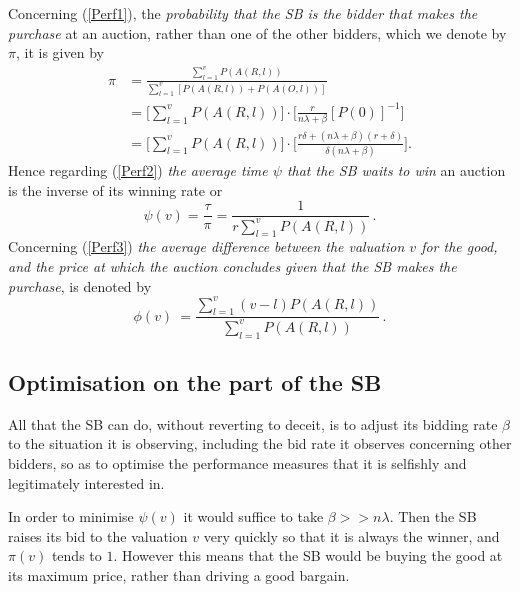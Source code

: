 \documentclass{article}
\begin{document}
Concerning (\ref{Perf1}),  the {\em probability that the SB is the
bidder that makes the purchase} at an auction, rather than one of
the other bidders, which we denote by $\pi$, it is given by
\begin{align} \label{eq:pi_WinningProb}
\pi &=\frac{\sum_{l=1}^{v} P(A(R,l))}{\sum_{l=1}^{v}[P(A(R,l))+P(A(O,l))]} \\
&=\bigg[\sum_{l=1}^{v} P(A(R,l)) \bigg] \cdot \bigg[
\frac{r}{n\lambda+\beta} [P(0)]^{-1} \bigg] \nonumber \\
&=\bigg[\sum_{l=1}^{v} P(A(R,l))\bigg] \cdot \bigg[
\frac{r\delta+(n\lambda+\beta)(r+\delta)} {\delta(n\lambda+\beta)}
\bigg]. \nonumber
\end{align}
Hence regarding (\ref{Perf2}) {\em the average time $\psi$ that
the SB waits to win} an auction is the inverse of its winning rate
or
\begin{equation} \label{eq:FirstModel_ExpWaitToWin}
\psi(v)=\frac{\tau}{\pi}=\frac{1}{r\sum_{l=1}^{v}P(A(R,l))} \,.
\nonumber
\end{equation}
Concerning (\ref{Perf3}) {\em the average difference between the
valuation $v$ for the good, and the price at which the auction
concludes given that the SB makes the purchase}, is denoted by
\begin{equation} \phi(v)\ = \frac{ \sum_{l=1}^{v} (v-l) P(A(R,l))
}{ \sum_{l=1}^{v}P(A(R,l))} \,.
\end{equation}

\subsection{Optimisation on the part of the SB}

All that the SB can do, without reverting to deceit, is to adjust
its bidding rate $\beta$ to the situation it is observing,
including the bid rate it observes concerning other bidders, so as
to optimise the performance measures that it is selfishly and
legitimately interested in.

In order to minimise $\psi(v)$ it would suffice to take
$\beta>>n\lambda$. Then the SB raises its bid to the valuation $v$
very quickly so that it is always the winner, and $\pi(v)$ tends
to $1$. However this means that the SB would be buying the good at
its maximum price, rather than driving a good bargain.
\end{document}
